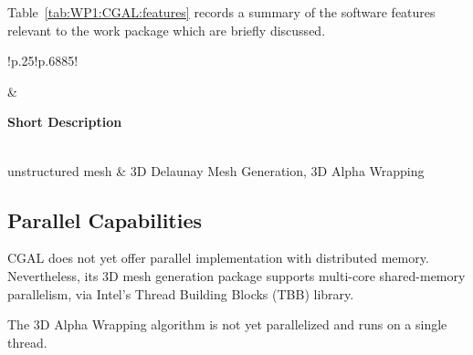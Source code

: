 Table~\cref{tab:WP1:CGAL:features} records a summary of the software features relevant to the work package which are briefly discussed.

\begin{table}[h!]
    \centering
    { 
        \setlength{\parindent}{0pt}
        \def\arraystretch{1.25}
        {
            \fontsize{9}{11}\selectfont
            \begin{tabular}{!{\color{numpexgray}\vrule}p{.25\linewidth}!{\color{numpexgray}\vrule}p{.6885\linewidth}!{\color{numpexgray}\vrule}}
    
     &  {\rule{0pt}{2.5ex}\color{white}\bf Short Description }\\ 
    
    unstructured mesh & 3D Delaunay Mesh Generation, 3D Alpha Wrapping \\
\end{tabular}
        }
    }
    \caption{WP1: CGAL Features}
    \label{tab:WP1:CGAL:features}
\end{table}


\subsection{Parallel Capabilities}
\label{sec:WP1:CGAL:performances}


CGAL does not yet offer parallel implementation with distributed memory. Nevertheless, its 3D mesh generation package supports multi-core shared-memory parallelism, via Intel's Thread Building Blocks (TBB) library.

The 3D Alpha Wrapping algorithm is not yet parallelized and runs on a single thread.

